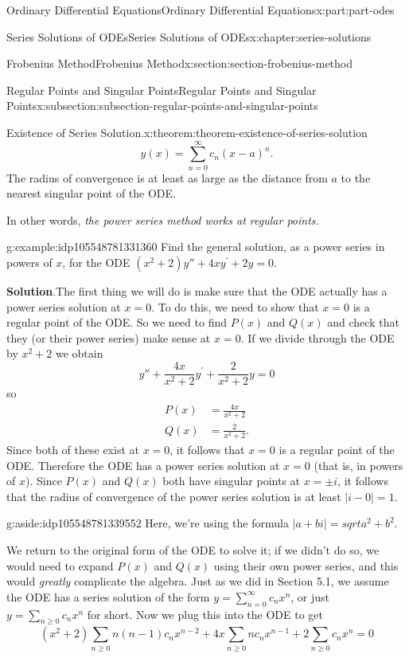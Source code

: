 \documentclass[oneside,10pt,]{book}
\newcommand{\blocktitlefont}{\relax}
\numberwithin{equation}{part}
\newcommand{\amp}{&}
\begin{document}
\begin{partptx}{Ordinary Differential Equations}{}{Ordinary Differential Equations}{}{}{x:part:part-odes}
\begin{chapterptx}{Series Solutions of ODEs}{}{Series Solutions of ODEs}{}{}{x:chapter:series-solutions}
\begin{sectionptx}{Frobenius Method}{}{Frobenius Method}{}{}{x:section:section-frobenius-method}
\begin{subsectionptx}{Regular Points and Singular Points}{}{Regular Points and Singular Points}{}{}{x:subsection:subsection-regular-points-and-singular-points}
\begin{theorem}{Existence of Series Solution.}{}{x:theorem:theorem-existence-of-series-solution}
\begin{equation*}
y(x) = \sum_{n=0}^{\infty}c_{n}(x-a)^{n}.
\end{equation*}
The radius of convergence is at least as large as the distance from \(a\) to the nearest singular point of the ODE.%
\end{theorem}
In other words, \emph{the power series method works at regular points.}%
\begin{example}{}{g:example:idp105548781331360}%
Find the general solution, as a power series in powers of \(x\), for the ODE \((x^{2}+2)y''+4xy^\prime+2y=0\).%
\par\smallskip%
\noindent\textbf{\blocktitlefont Solution}.\hypertarget{g:solution:idp105548781332640}{}\quad{}The first thing we will do is make sure that the ODE actually has a power series solution at \(x=0\). To do this, we need to show that \(x=0\) is a regular point of the ODE. So we need to find \(P(x)\) and \(Q(x)\) and check that they (or their power series) make sense at \(x=0\). If we divide through the ODE by \(x^{2}+2\) we obtain%
\begin{equation*}
y''+\frac{4x}{x^{2}+2}y^\prime+\frac{2}{x^{2}+2}y = 0
\end{equation*}
so%
\begin{align*}
P(x) \amp= \frac{4x}{x^{2}+2}\\
Q(x) \amp= \frac{2}{x^{2}+2}\text{.}
\end{align*}
Since both of these exist at \(x=0\), it follows that \(x=0\) is a regular point of the ODE. Therefore the ODE has a power series solution at \(x=0\) (that is, in powers of \(x\)). Since \(P(x)\) and \(Q(x)\) both have singular points at \(x=\pm i\), it follows that the radius of convergence of the power series solution is at least \(|i - 0| = 1\).%
\begin{aside}{}{g:aside:idp105548781339552}%
Here, we're using the formula \(|a+bi| = sqrt{a^2 + b^2}.\)%
\end{aside}
We return to the original form of the ODE to solve it; if we didn't do so, we would need to expand \(P(x)\) and \(Q(x)\) using their own power series, and this would \emph{greatly} complicate the algebra. Just as we did in Section 5.1, we assume the ODE has a series solution of the form \(y = \sum_{n=0}^{\infty}c_{n}x^{n}\), or just \(y=\sum_{n\geq0}c_{n}x^{n}\) for short. Now we plug this into the ODE to get%
\begin{equation*}
(x^{2}+2)\sum_{n\geq0}^{}n(n-1)c_{n}x^{n-2}+4x\sum_{n\geq0}^{}nc_{n}x^{n-1}+2\sum_{n\geq0}^{}c_{n}x^{n} = 0

\end{equation*}
\end{example}
\end{subsectionptx}
\end{sectionptx}
\end{chapterptx}
\end{partptx}
\end{document}
